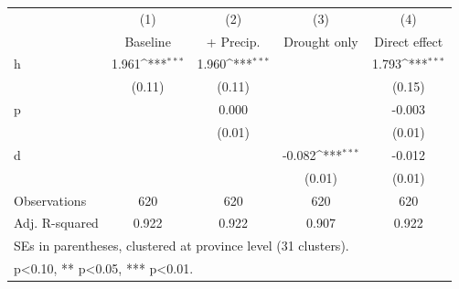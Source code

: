 {
\def\sym#1{\ifmmode^{#1}\else\(^{#1}\)\fi}
\begin{tabular}{l*{4}{c}}
\toprule
                    &\multicolumn{1}{c}{(1)}&\multicolumn{1}{c}{(2)}&\multicolumn{1}{c}{(3)}&\multicolumn{1}{c}{(4)}\\
                    &\multicolumn{1}{c}{Baseline}&\multicolumn{1}{c}{+ Precip.}&\multicolumn{1}{c}{Drought only}&\multicolumn{1}{c}{Direct effect}\\
\midrule
h                   &       1.961\sym{***}&       1.960\sym{***}&                     &       1.793\sym{***}\\
                    &      (0.11)         &      (0.11)         &                     &      (0.15)         \\
\addlinespace
p                   &                     &       0.000         &                     &      -0.003         \\
                    &                     &      (0.01)         &                     &      (0.01)         \\
\addlinespace
d                   &                     &                     &      -0.082\sym{***}&      -0.012         \\
                    &                     &                     &      (0.01)         &      (0.01)         \\
\midrule
Observations        &         620         &         620         &         620         &         620         \\
Adj. R-squared      &       0.922         &       0.922         &       0.907         &       0.922         \\
\bottomrule
\multicolumn{5}{l}{\footnotesize SEs in parentheses, clustered at province level (31 clusters).}\\
\multicolumn{5}{l}{\footnotesize * p<0.10, ** p<0.05, *** p<0.01.}\\
\end{tabular}
}
